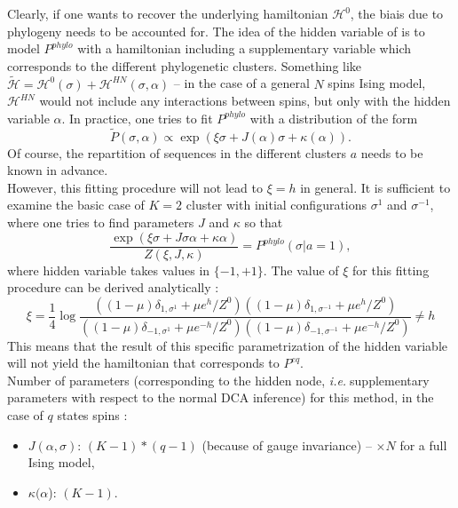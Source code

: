 \documentclass[10pt]{article}
\newcommand{\ie}{\emph{i.e.}$\;$}
\begin{document}
	Clearly, if one wants to recover the underlying hamiltonian $\mathcal{H}^0$, the biais due to phylogeny needs to be accounted for. The idea of the hidden variable of is to model $P^{phylo}$ with a hamiltonian including a supplementary variable which corresponds to the different phylogenetic clusters. Something like $\tilde{\mathcal{H}} = \mathcal{H}^0(\sigma) + \mathcal{H}^{HN}(\sigma,\alpha)$ -- in the case of a general $N$ spins Ising model, $\mathcal{H}^{HN}$ would not include any interactions between spins, but only with the hidden variable $\alpha$. In practice, one tries to fit $P^{phylo}$ with a distribution of the form 
	\begin{equation}
		\label{eq:HN_basic}
		\tilde{P}(\sigma,\alpha) \propto \exp\left(\xi\sigma + J(\alpha)\sigma + \kappa(\alpha)\right).
	\end{equation}
	Of course, the repartition of sequences in the different clusters $a$ needs to be known in advance.\\
	However, this fitting procedure will not lead to $\xi = h$ in general. It is sufficient to examine the basic case of $K=2$ cluster with initial configurations $\sigma^1$ and $\sigma^{-1}$, where one tries to find parameters $J$ and $\kappa$ so that 
	$$ \frac{\exp\left(\xi\sigma + J\sigma\alpha + \kappa\alpha\right)}{Z(\xi,J,\kappa)} = P^{phylo}(\sigma\vert a=1), $$
	where hidden variable takes values in $\{-1,+1\}$.
	The value of $\xi$ for this fitting procedure can be derived analytically : 
	\begin{equation}
	\label{eq:xi_vs_h}	 	
	\xi = \frac{1}{4}\log\frac{\left( (1-\mu)\delta_{1,\sigma^1} + \mu e^h/Z^0\right)\left( (1-\mu)\delta_{1,\sigma^{-1}} + \mu e^h/Z^0 \right)}{\left( (1-\mu)\delta_{-1,\sigma^1} + \mu e^{-h}/Z^0\right)\left( (1-\mu)\delta_{-1,\sigma^{-1}} + \mu e^{-h}/Z^0 \right)} \neq h
	 \end{equation} 
	This means that the result of this specific parametrization of the hidden variable will not yield the hamiltonian that corresponds to $P^{eq}$.\\
	Number of parameters (corresponding to the hidden node, \ie supplementary parameters with respect to the normal DCA inference) for this method, in the case of $q$ states spins : 
	\begin{itemize}
		\item $J(\alpha,\sigma)$: $(K-1)*(q-1)$ (because of gauge invariance) -- $\times N$ for a full Ising model,
		\item $\kappa(\alpha$): $(K-1)$.
	\end{itemize}
\end{document}
